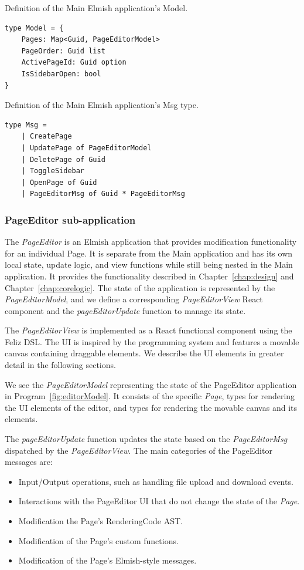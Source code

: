 \begin{listing}[htbp]
	\caption{Definition of the Main Elmish application's Model.}
	\label{fig:appmodel}
	\begin{lstlisting}
type Model = {
    Pages: Map<Guid, PageEditorModel>
    PageOrder: Guid list
    ActivePageId: Guid option
    IsSidebarOpen: bool
}
    \end{lstlisting}
\end{listing}

\begin{listing}[htbp]
	\caption{Definition of the Main Elmish application's Msg type.}
	\label{fig:appMsg}
	\begin{lstlisting}
type Msg =
    | CreatePage
    | UpdatePage of PageEditorModel
    | DeletePage of Guid
    | ToggleSidebar
    | OpenPage of Guid
    | PageEditorMsg of Guid * PageEditorMsg
    \end{lstlisting}
\end{listing}
\medskip
\subsubsection{PageEditor sub-application}

The \emph{PageEditor} is an Elmish application that provides modification functionality for an individual Page.
It is separate from the Main application and has its own local state, update logic, and view functions while still being nested in the Main application.
It provides the functionality described in Chapter~\ref{chap:design} and Chapter~\ref{chap:corelogic}.
The state of the application is represented by the \emph{PageEditorModel}, and we define a corresponding \emph{PageEditorView} React component and the \emph{pageEditorUpdate} function to manage its state.

The \emph{PageEditorView} is implemented as a React functional component using the Feliz DSL.
The UI is inspired by the \citet{darklang} programming system and features a movable canvas containing draggable elements.
We describe the UI elements in greater detail in the following sections.

We see the \emph{PageEditorModel} representing the state of the PageEditor application in Program~\ref{fig:editorModel}.
It consists of the specific \emph{Page}, types for rendering the UI elements of the editor, and types for rendering the movable canvas and its elements.

The \emph{pageEditorUpdate} function updates the state based on the \emph{PageEditorMsg} dispatched by the \emph{PageEditorView}.
The main categories of the PageEditor messages are:
\begin{itemize}
	\item Input/Output operations, such as handling file upload and download events.
	\item Interactions with the PageEditor UI that do not change the state of the \emph{Page}.
	\item Modification the Page's RenderingCode AST.
	\item Modification of the Page's custom functions.
	\item Modification of the Page's Elmish-style messages.
\end{itemize}


